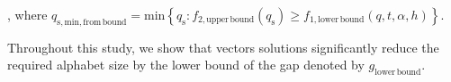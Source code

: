 , where $q_{\mathrm{s,min,from\,bound}}=\mathrm{min}\left\{ q_{\mathrm{s}}:f_{\mathrm{2,upper\,bound}}\left(q_{\mathrm{s}}\right)\geq f_{\mathrm{1,lower\,bound}}\left(q,t,\alpha,h\right)\right\} $. 

Throughout this study, we show that vectors solutions significantly
reduce the required alphabet size by the lower bound of the gap denoted
by $g_{\mathrm{lower\,bound}}$.

\clearpage